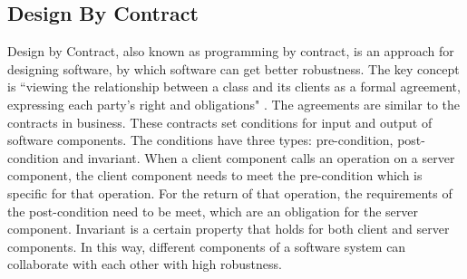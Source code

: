 
%


\subsection{Design By Contract}
Design by Contract, also known as programming by contract, is an approach for designing software, by which software can get better robustness. The key concept is ``viewing the relationship between a class and its clients as a formal agreement, expressing each party's right and obligations" \cite{jj}. The agreements are similar to the contracts in business. These contracts set conditions for input and output of software components. The conditions have three types: pre-condition, post-condition and invariant. When a client component calls an operation on a server component, the client component needs to meet the pre-condition which is specific for that operation. For the return of that operation, the requirements of the post-condition need to be meet, which are an obligation for the server component. Invariant is a certain property that holds for both client and server components. In this way, different components of a software system can collaborate with each other with high robustness. 

